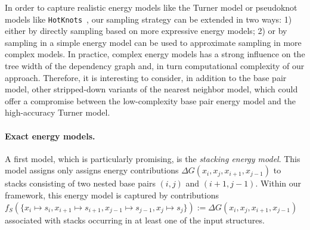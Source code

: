 \documentclass[]{bmcart}
\newcommand{\val}{\bar S} %
\newcommand{\Def}[1]{\emph{#1}}
\newcommand{\evalfor}[2]{#1(#2)}
\newcommand{\citep}[1]{\cite{#1}}
\begin{document}

In order to capture realistic energy models like the Turner model or pseudoknot models like {\tt HotKnots}~\citep{Ren2005}, our sampling strategy can be extended in two ways: 1) either by directly sampling based on more expressive energy models; 2) or by sampling in a simple energy model can be used to approximate sampling in more complex models.  In practice, complex energy models has a strong influence on the tree width of the dependency graph and, in turn computational complexity of our approach. Therefore, it is interesting to consider, in addition to the base pair model, other
stripped-down variants of the nearest neighbor model, which could offer a compromise between the low-complexity base pair energy model and the high-accuracy Turner model. 


\paragraph{Exact energy models.}
A first model, which is particularly promising, is the
\Def{stacking energy model}. This model assigns only assigns energy
contributions $\Delta G(x_i,x_j,x_{i+1},x_{j-1})$ to stacks consisting of two nested base pairs $(i,j)$ and $(i+1,j-1)$. Within our framework, this energy model is captured by contributions $f_S(\{x_i\mapsto s_i, x_{i+1}\mapsto s_{i+1}, x_{j-1}\mapsto s_{j-1}, x_{j}\mapsto s_{j}\}):=\Delta G(x_i,x_j,x_{i+1},x_{j-1})$ associated with stacks occurring in at least one of the input structures.
\end{document}
